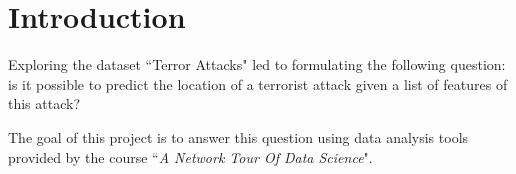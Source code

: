 \section{Introduction}
\label{sec:Introduction}
Exploring the dataset ``Terror Attacks" led to formulating the following question: is it possible to predict the location of a terrorist attack given a list of features of this attack? 

The goal of this project is to answer this question using data analysis tools provided by the course ``\textit{A Network Tour Of Data Science}".